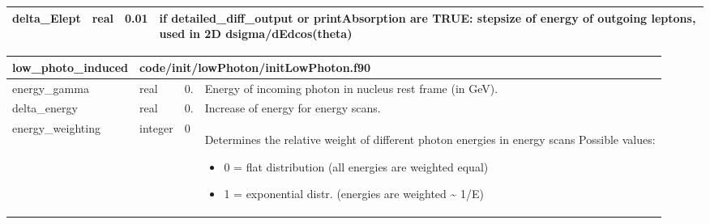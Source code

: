 \documentclass{article}
\begin{document}
\begin{longtable}{llll}
\midrule
delta\_Elept & \begin{minipage}[t]{2cm}real\end{minipage} & \begin{minipage}[t]{2cm}0.01\end{minipage} & \begin{minipage}[t]{12cm}if detailed\_diff\_output or printAbsorption are TRUE: stepsize of energy of outgoing leptons, used in 2D dsigma/dEdcos(theta)\end{minipage}\\*
\bottomrule
\end{longtable}
{ }




\begin{longtable}{llll}
\toprule
\textbf{\large{low\_photo\_induced}} & \multicolumn{3}{l}{\footnotesize{code/init/lowPhoton/initLowPhoton.f90}}\\*
\midrule
\endfirsthead
\midrule
\endhead
energy\_gamma & \begin{minipage}[t]{2cm}real\end{minipage} & \begin{minipage}[t]{2cm}0.\end{minipage} & \begin{minipage}[t]{12cm}Energy of incoming photon in nucleus rest frame (in GeV).\end{minipage}\\*
\midrule
delta\_energy & \begin{minipage}[t]{2cm}real\end{minipage} & \begin{minipage}[t]{2cm}0.\end{minipage} & \begin{minipage}[t]{12cm}Increase of energy for energy scans.\end{minipage}\\*
\midrule
energy\_weighting & \begin{minipage}[t]{2cm}integer\end{minipage} & \begin{minipage}[t]{2cm}0\end{minipage} & \begin{minipage}[t]{12cm}Determines the relative weight of different photon energies in energy scans Possible values:\begin{itemize}\leftmargin0em\itemindent0pt\item 0 = flat distribution (all energies are weighted equal)\item 1 = exponential distr. (energies are weighted \~{} 1/E)\end{itemize}\end{minipage}\\*
\bottomrule
\end{longtable}
{ }
\end{document}
